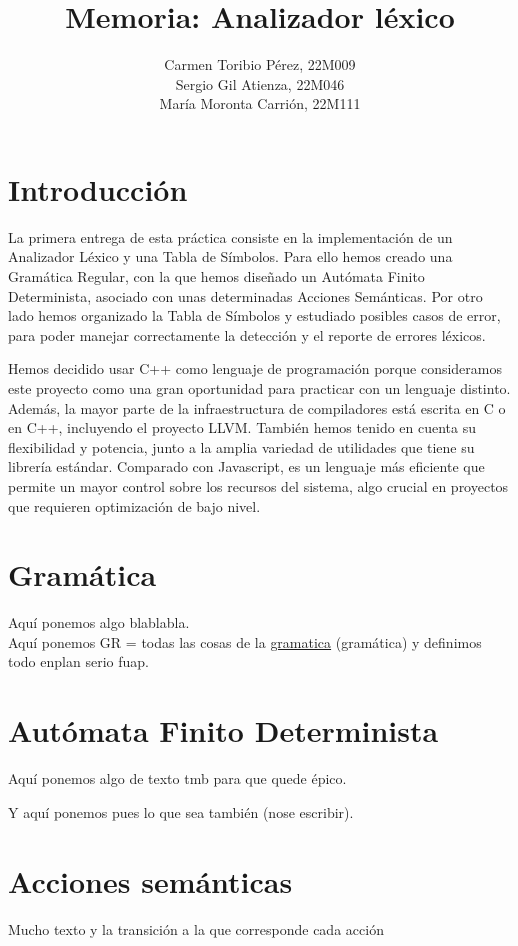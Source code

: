 \documentclass{article}
\title{\textbf{Memoria: Analizador léxico}}
\author{Carmen Toribio Pérez, 22M009\\Sergio Gil Atienza, 22M046\\María Moronta Carrión, 22M111}
\date{}
\begin{document}
\maketitle

\section{Introducción}
La primera entrega de esta práctica consiste en la implementación de un Analizador Léxico y una Tabla de Símbolos. Para ello hemos creado una Gramática Regular, con la que hemos diseñado un Autómata Finito Determinista, asociado con unas determinadas Acciones Semánticas. Por otro lado hemos organizado la Tabla de Símbolos y estudiado posibles casos de error, para poder manejar correctamente la detección y el reporte de errores léxicos. 


Hemos decidido usar C++ como lenguaje de programación porque consideramos este proyecto como una gran oportunidad para practicar con un lenguaje distinto. Además, la mayor parte de la infraestructura de compiladores está escrita en C o en C++, incluyendo el proyecto LLVM. También hemos tenido en cuenta su flexibilidad y potencia, junto a la amplia variedad de utilidades que tiene su librería estándar. Comparado con Javascript, es un lenguaje más eficiente que permite un mayor control sobre los recursos del sistema, algo crucial en proyectos que requieren optimización de bajo nivel. 

\section{Gramática}
Aquí ponemos algo blablabla. \\
Aquí ponemos GR = {todas las cosas de la \underline{gramatica} (gramática)} y definimos todo enplan serio fuap.

\section{Autómata Finito Determinista}
Aquí ponemos algo de texto tmb para que quede épico.



Y aquí ponemos pues lo que sea también (nose escribir).

\section{Acciones semánticas}
Mucho texto y la transición a la que corresponde cada acción
\end{document}
